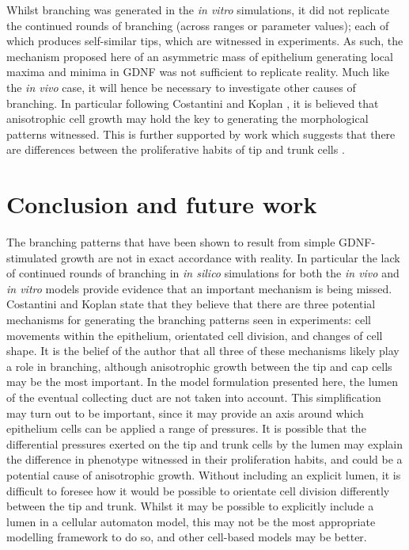 \documentclass[pdftex,10pt,a4paper,twocolumn]{article}
\begin{document}
Whilst branching was generated in the \textit{in vitro} simulations, it did not replicate the continued rounds of branching (across ranges or parameter values); each of which produces self-similar tips, which are witnessed in experiments. As such, the mechanism proposed here of an asymmetric mass of epithelium generating local maxima and minima in GDNF was not sufficient to replicate reality. Much like the \textit{in vivo} case, it will hence be necessary to investigate other causes of branching. In particular following Costantini and Koplan \cite{CostantiniFKopan2010}, it is believed that anisotrophic cell growth may hold the key to generating the  morphological patterns witnessed. This is further supported by work which suggests that there are differences between the proliferative habits of tip and trunk cells \cite{packard2013luminal}.

\section{Conclusion and future work}
The branching patterns that have been shown to result from simple GDNF-stimulated growth are not in exact accordance with reality. In particular the lack of continued rounds of branching in \textit{in silico} simulations for both the \textit{in vivo} and \textit{in vitro} models provide evidence that an important mechanism is being missed. Costantini and Koplan \cite{CostantiniFKopan2010} state that they believe that there are three potential mechanisms for generating the branching patterns seen in experiments: cell movements within the epithelium, orientated cell division, and changes of cell shape. It is the belief of the author that all three of these mechanisms likely play a role in branching, although anisotrophic growth between the tip and cap cells may be the most important. In the model formulation presented here, the lumen of the eventual collecting duct are not taken into account. This simplification may turn out to be important, since it may provide an axis around which epithelium cells can be applied a range of pressures. It is possible that the differential pressures exerted on the tip and trunk cells by the lumen may explain the difference in phenotype witnessed in their proliferation habits, and could be a potential cause of anisotrophic growth. Without including an explicit lumen, it is difficult to foresee how it would be possible to orientate cell division differently between the tip and trunk. Whilst it may be possible to explicitly include a lumen in a cellular automaton model, this may not be the most appropriate modelling framework to do so, and other cell-based models may be better.




\end{document}
